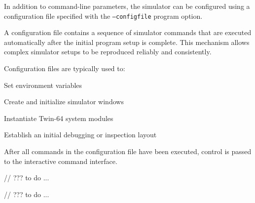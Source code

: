 
In addition to command-line parameters, the simulator can be configured using
a configuration file specified with the \texttt{--configfile} program option.

A configuration file contains a sequence of simulator commands that are
executed automatically after the initial program setup is complete. This
mechanism allows complex simulator setups to be reproduced reliably and
consistently.

Configuration files are typically used to:
\begin{smallGapItemize}
    \item Set environment variables
    \item Create and initialize simulator windows
    \item Instantiate Twin-64 system modules
    \item Establish an initial debugging or inspection layout
\end{smallGapItemize}

After all commands in the configuration file have been executed, control is
passed to the interactive command interface.


// ??? to do ...


// ??? to do ...